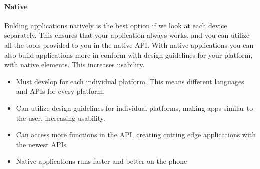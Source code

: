 \paragraph{Native}
	Bulding applications natively is the best option if we look at each device
	separately. This ensures that your application always works, and you can
	utilize all the tools provided to you in the native API. With native
	applications you can also build applications more in conform with design
	guidelines for your platform, with native elements. This increases
	usability.

	\begin{itemize}
		\item Must develop for each individual platform. This means different
		languages and APIs for every platform.
		\item Can utilize design guidelines for individual platforms, making
		apps similar to the user, increasing usability.
		\item Can access more functions in the API, creating cutting edge
		applications with the newest APIs
		\item Native applications runs faster and better on the phone
	\end{itemize}
